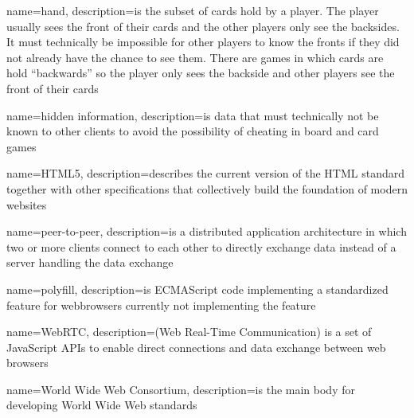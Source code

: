 {
  name=hand,
  description={is the subset of cards hold by a player. The player usually sees
  the front of their cards and the other players only see the backsides. It must
  technically be impossible for other players to know the fronts if they did
  not already have the chance to see them. There are games in which cards are
  hold “backwards” so the player only sees the backside and other players see
  the front of their cards}
}

{
  name={hidden information},
  description={is data that must technically not be known to other clients to
  avoid the possibility of cheating in board and card games}
}

{
  name=HTML5,
  description={describes the current version of the HTML standard together with
  other specifications that collectively build the foundation of modern
  websites}
}



{
  name=peer-to-peer,
  description={is a distributed application architecture in which two or more
  clients connect to each other to directly exchange data instead of a server
  handling the data exchange}
}

{
  name=polyfill,
  description={is \gls{ECMAScript} code implementing a standardized feature for
  webbrowsers currently not implementing the feature}
}


{
  name=WebRTC,
  description={(Web Real-Time Communication) is a set of JavaScript \glspl{API}
  to enable direct connections and data exchange between web browsers}
}

{
  name={World Wide Web Consortium},
  description={is the main body for developing World Wide Web standards}
}
